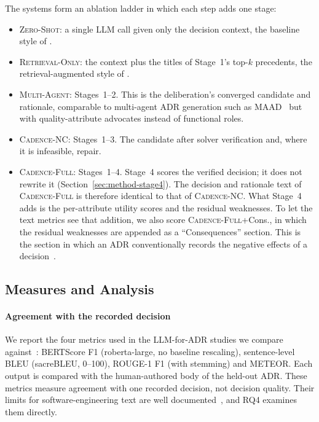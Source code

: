 \documentclass[preprint,12pt,authoryear]{elsarticle}
\newcommand{\sysZS}{\textsc{Zero-Shot}}
\newcommand{\sysRO}{\textsc{Retrieval-Only}}
\newcommand{\sysMA}{\textsc{Multi-Agent}}
\newcommand{\sysNC}{\textsc{Cadence-NC}}
\newcommand{\sysFull}{\textsc{Cadence-Full}}
\renewcommand{\_}{\textunderscore\allowbreak{}}
\begin{document}
The systems form an ablation ladder in which each step adds one stage:
\begin{itemize}[leftmargin=*,itemsep=1pt,topsep=2pt,parsep=0pt]
\item \sysZS{}: a single LLM call given only the decision context, the baseline style of \citet{dhar2024llm}.
\item \sysRO{}: the context plus the titles of Stage~1's top-$k$ precedents, the retrieval-augmented style of \citet{contextmatters2026}.
\item \sysMA{}: Stages~1--2. This is the deliberation's converged candidate and rationale, comparable to multi-agent ADR generation such as MAAD~\citep{zhang2025maad} but with quality-attribute advocates instead of functional roles.
\item \sysNC{}: Stages~1--3. The candidate after solver verification and, where it is infeasible, repair.
\item \sysFull{}: Stages~1--4. Stage~4 scores the verified decision; it does not rewrite it (Section~\ref{sec:method-stage4}). The decision and rationale text of \sysFull{} is therefore identical to that of \sysNC{}. What Stage~4 adds is the per-attribute utility scores and the residual weaknesses. To let the text metrics see that addition, we also score \sysFull{}+Cons., in which the residual weaknesses are appended as a ``Consequences'' section. This is the section in which an ADR conventionally records the negative effects of a decision~\citep{tyree2005}.
\end{itemize}

\subsection{Measures and Analysis}

\paragraph{Agreement with the recorded decision} We report the four metrics used in the LLM-for-ADR studies we compare against~\citep{dhar2024llm,contextmatters2026}: BERTScore F1 (roberta-large, no baseline rescaling), sentence-level BLEU (sacreBLEU, 0--100), ROUGE-1 F1 (with stemming) and METEOR. Each output is compared with the human-authored body of the held-out ADR. These metrics measure agreement with one recorded decision, not decision quality. Their limits for software-engineering text are well documented~\citep{roy2021,evtikhiev2023,haque2022}, and RQ4 examines them directly.
\end{document}
